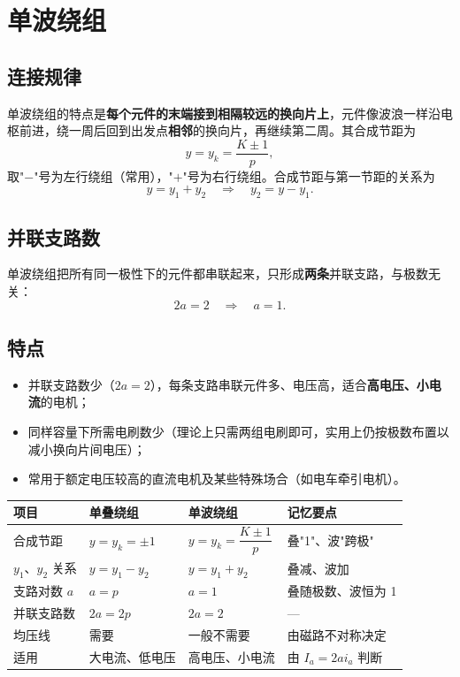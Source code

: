 \section{单波绕组}

\subsection{连接规律}
单波绕组的特点是\textbf{每个元件的末端接到相隔较远的换向片上}，元件像波浪一样沿电枢前进，绕一周后回到出发点\textbf{相邻}的换向片，再继续第二周。其合成节距为
\begin{equation}
y=y_k=\frac{K\pm1}{p},
\end{equation}
取"$-$"号为左行绕组（常用），"$+$"号为右行绕组。合成节距与第一节距的关系为
\begin{equation}
y=y_1+y_2\quad\Longrightarrow\quad y_2=y-y_1 .
\end{equation}

\subsection{并联支路数}
单波绕组把所有同一极性下的元件都串联起来，只形成\textbf{两条}并联支路，与极数无关：
\begin{equation}
2a=2\quad\Longrightarrow\quad a=1 .
\end{equation}


\subsection{特点}
\begin{itemize}
  \item 并联支路数少（$2a=2$），每条支路串联元件多、电压高，适合\textbf{高电压、小电流}的电机；
  \item 同样容量下所需电刷数少（理论上只需两组电刷即可，实用上仍按极数布置以减小换向片间电压）；
  \item 常用于额定电压较高的直流电机及某些特殊场合（如电车牵引电机）。
\end{itemize}

\begin{center}
\begin{tabular}{@{}p{2.0cm}p{3.4cm}p{3.6cm}p{4.2cm}@{}}
\toprule
项目 & 单叠绕组 & 单波绕组 & 记忆要点 \\
\midrule
合成节距 & $y=y_k=\pm1$ & $y=y_k=\dfrac{K\pm1}{p}$ & 叠"1"、波"跨极" \\
$y_1$、$y_2$ 关系 & $y=y_1-y_2$ & $y=y_1+y_2$ & 叠减、波加 \\
支路对数 $a$ & $a=p$ & $a=1$ & 叠随极数、波恒为 1 \\
并联支路数 & $2a=2p$ & $2a=2$ & — \\
均压线 & 需要 & 一般不需要 & 由磁路不对称决定 \\
适用 & 大电流、低电压 & 高电压、小电流 & 由 $I_a=2ai_a$ 判断 \\
\bottomrule
\end{tabular}
\end{center}

